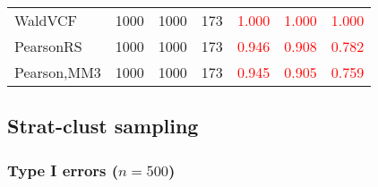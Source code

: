 \documentclass[
]{article}
\begin{document}
\begin{table}[H]
{\begin{tabular}[t]{lrrrrrr}
\hspace{1em}WaldVCF & 1000 & 1000 & 173 & \textcolor{red}{1.000} & \textcolor{red}{1.000} & \textcolor{red}{1.000}\\
\hspace{1em}PearsonRS & 1000 & 1000 & 173 & \textcolor{red}{0.946} & \textcolor{red}{0.908} & \textcolor{red}{0.782}\\
\hspace{1em}Pearson,MM3 & 1000 & 1000 & 173 & \textcolor{red}{0.945} & \textcolor{red}{0.905} & \textcolor{red}{0.759}\\
\bottomrule
\end{tabular}}
\endgroup{}
\end{table}

\hypertarget{strat-clust-sampling}{%
\subsection{Strat-clust sampling}\label{strat-clust-sampling}}

\hypertarget{type-i-errors-n500-3}{%
\subsubsection{\texorpdfstring{Type I errors
(\(n=500\))}{Type I errors (n=500)}}\label{type-i-errors-n500-3}}
\end{document}
